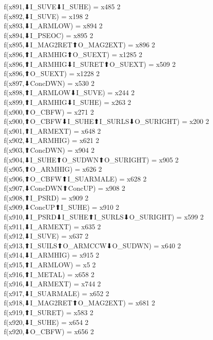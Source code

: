 f(x891,⬇I_SUVE⬇I_SUHE) = x485 {2} \\
f(x892,⬇I_SUVE) = x198 {2} \\
f(x893,⬇I_ARMLOW) = x894 {2} \\
f(x894,⬇I_PSEOC) = x895 {2} \\
f(x895,⬇I_MAG2RET⬆O_MAG2EXT) = x896 {2} \\
f(x896,⬆I_ARMHIG⬆O_SUEXT) = x1285 {2} \\
f(x896,⬆I_ARMHIG⬇I_SURET⬆O_SUEXT) = x509 {2} \\
f(x896,⬆O_SUEXT) = x1228 {2} \\
f(x897,⬇ConcDWN) = x530 {2} \\
f(x898,⬆I_ARMLOW⬇I_SUVE) = x244 {2} \\
f(x899,⬆I_ARMHIG⬇I_SUHE) = x263 {2} \\
f(x900,⬆O_CBFW) = x271 {2} \\
f(x900,⬆O_CBFW⬇I_SUHE⬆I_SURLS⬇O_SURIGHT) = x200 {2} \\
f(x901,⬆I_ARMEXT) = x648 {2} \\
f(x902,⬇I_ARMHIG) = x621 {2} \\
f(x903,⬆ConcDWN) = x904 {2} \\
f(x904,⬇I_SUHE⬆O_SUDWN⬆O_SURIGHT) = x905 {2} \\
f(x905,⬆O_ARMHIG) = x626 {2} \\
f(x906,⬆O_CBFW⬆I_SUARMALE) = x628 {2} \\
f(x907,⬇ConcDWN⬆ConcUP) = x908 {2} \\
f(x908,⬆I_PSRD) = x909 {2} \\
f(x909,⬇ConcUP⬆I_SUHE) = x910 {2} \\
f(x910,⬇I_PSRD⬇I_SUHE⬆I_SURLS⬇O_SURIGHT) = x599 {2} \\
f(x911,⬇I_ARMEXT) = x635 {2} \\
f(x912,⬇I_SUVE) = x637 {2} \\
f(x913,⬆I_SUILS⬆O_ARMCCW⬇O_SUDWN) = x640 {2} \\
f(x914,⬇I_ARMHIG) = x915 {2} \\
f(x915,⬆I_ARMLOW) = x5 {2} \\
f(x916,⬆I_METAL) = x658 {2} \\
f(x916,⬇I_ARMEXT) = x744 {2} \\
f(x917,⬇I_SUARMALE) = x652 {2} \\
f(x918,⬇I_MAG2RET⬆O_MAG2EXT) = x681 {2} \\
f(x919,⬆I_SURET) = x583 {2} \\
f(x920,⬇I_SUHE) = x654 {2} \\
f(x920,⬇O_CBFW) = x656 {2} \\
